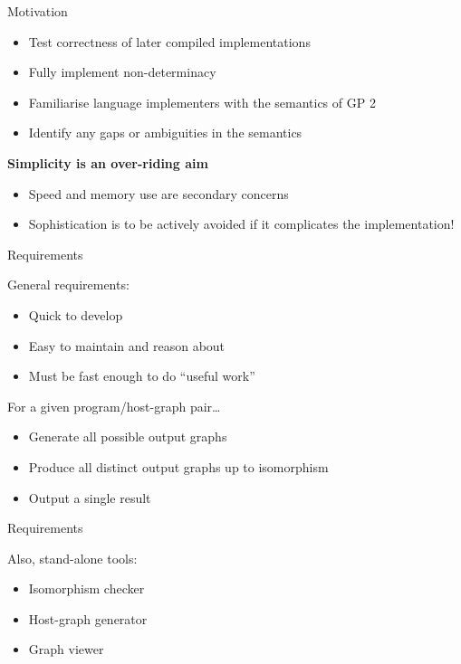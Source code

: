 \begin{frame}{Motivation}

\begin{itemize}
\itemsep1pt\parskip0pt
\item
  Test correctness of later compiled implementations
\item
  Fully implement non-determinacy
\item
  Familiarise language implementers with the semantics of GP 2
\item
  Identify any gaps or ambiguities in the semantics
\end{itemize}

\pause

\textbf{Simplicity is an over-riding aim}

\begin{itemize}
\itemsep1pt\parskip0pt
\item
  Speed and memory use are secondary concerns
\item
  Sophistication is to be actively avoided if it complicates the
  implementation!
\end{itemize}

\end{frame}

\begin{frame}{Requirements}

General requirements:

\begin{itemize}
\itemsep1pt\parskip0pt
\item
  Quick to develop 
\item
  Easy to maintain and reason about
\item
  Must be fast enough to do ``useful work''
\end{itemize}

\pause

For a given program/host-graph pair\ldots{}

\begin{itemize}
\itemsep1pt\parskip0pt
\item
  Generate all possible output graphs 
\item
  Produce all distinct output graphs up to isomorphism 
\item
  Output a single result 
\end{itemize}

\end{frame}

\begin{frame}{Requirements}

Also, stand-alone tools:

\begin{itemize}
\itemsep1pt\parskip0pt
\item
  Isomorphism checker
\item
  Host-graph generator
\item
  Graph viewer
\end{itemize}

\end{frame}

